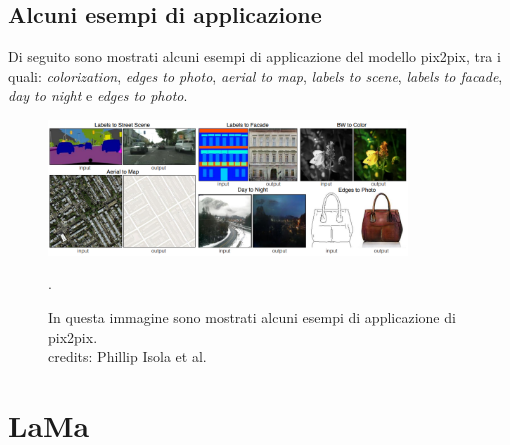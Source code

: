 \subsection{Alcuni esempi di applicazione}
Di seguito sono mostrati alcuni esempi di applicazione del modello pix2pix, tra i quali: \textit{colorization}, \textit{edges to photo}, \textit{aerial to map},
\textit{labels to scene}, \textit{labels to facade}, \textit{day to night} e \textit{edges to photo}.
    \begin{figure}[H]
        \centering
        \includegraphics[width=0.85\textwidth]{imgs/pix2pix_example_tasks.png}
        \caption{In questa immagine sono mostrati alcuni esempi di applicazione di pix2pix.\\
            credits: Phillip Isola et al. \cite{isola2018imagetoimage}}.
        \label{fig:pix2pix_example_tasks}
    \end{figure}


\section{LaMa}

